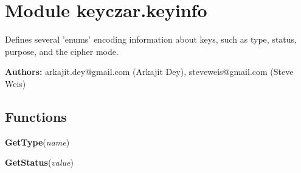%
%
%


\section{Module keyczar.keyinfo}

    \label{keyczar:keyinfo}
Defines several 'enums' encoding information about keys, such as type, 
status, purpose, and the cipher mode.

\textbf{Authors:}
arkajit.dey@gmail.com (Arkajit Dey),
    steveweis@gmail.com (Steve Weis)



  \subsection{Functions}

    \label{keyczar:keyinfo:GetType}

    \vspace{0.5ex}

\hspace{.8\funcindent}\begin{boxedminipage}{\funcwidth}

    \raggedright \textbf{GetType}(\textit{name})

\setlength{\parskip}{2ex}
\setlength{\parskip}{1ex}
    \end{boxedminipage}

    \label{keyczar:keyinfo:GetStatus}

    \vspace{0.5ex}

\hspace{.8\funcindent}\begin{boxedminipage}{\funcwidth}

    \raggedright \textbf{GetStatus}(\textit{value})

\setlength{\parskip}{2ex}
\setlength{\parskip}{1ex}
    \end{boxedminipage}

